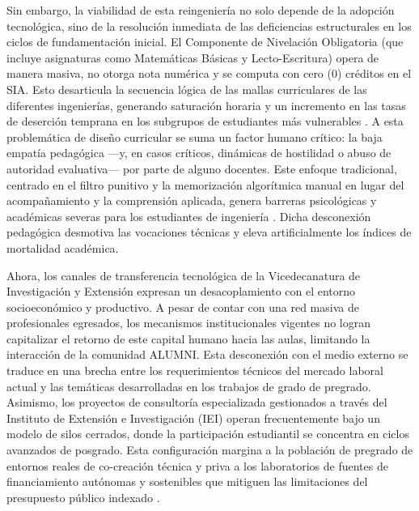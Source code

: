 \documentclass[journal,10pt,twocolumn,letterpaper]{IEEEtran}
\begin{document}
Sin embargo, la viabilidad de esta reingeniería no solo depende de la adopción tecnológica, sino de la resolución inmediata de las deficiencias estructurales en los ciclos de fundamentación inicial. El Componente de Nivelación Obligatoria (que incluye asignaturas como Matemáticas Básicas y Lecto-Escritura) opera de manera masiva, no otorga nota numérica y se computa con cero (0) créditos en el SIA. Esto desarticula la secuencia lógica de las mallas curriculares de las diferentes ingenierías, generando saturación horaria y un incremento en las tasas de deserción temprana en los subgrupos de estudiantes más vulnerables \cite{planeacion_unal_cifras}. A esta problemática de diseño curricular se suma un factor humano crítico: la baja empatía pedagógica —y, en casos críticos, dinámicas de hostilidad o abuso de autoridad evaluativa— por parte de alguno docentes. Este enfoque tradicional, centrado en el filtro punitivo y la memorización algorítmica manual en lugar del acompañamiento y la comprensión aplicada, genera barreras psicológicas y académicas severas para los estudiantes de ingeniería \cite{clima_aula_superior}. Dicha desconexión pedagógica desmotiva las vocaciones técnicas y eleva artificialmente los índices de mortalidad académica.

Ahora, los canales de transferencia tecnológica de la Vicedecanatura de Investigación y Extensión expresan un desacoplamiento con el entorno socioeconómico y productivo. A pesar de contar con una red masiva de profesionales egresados, los mecanismos institucionales vigentes no logran capitalizar el retorno de este capital humano hacia las aulas, limitando la interacción de la comunidad ALUMNI. Esta desconexión con el medio externo se traduce en una brecha entre los requerimientos técnicos del mercado laboral actual y las temáticas desarrolladas en los trabajos de grado de pregrado. Asimismo, los proyectos de consultoría especializada gestionados a través del Instituto de Extensión e Investigación (IEI) operan frecuentemente bajo un modelo de silos cerrados, donde la participación estudiantil se concentra en ciclos avanzados de posgrado. Esta configuración margina a la población de pregrado de entornos reales de co-creación técnica y priva a los laboratorios de fuentes de financiamiento autónomas y sostenibles que mitiguen las limitaciones del presupuesto público indexado \cite{planeacion_unal_cifras}.
\end{document}
